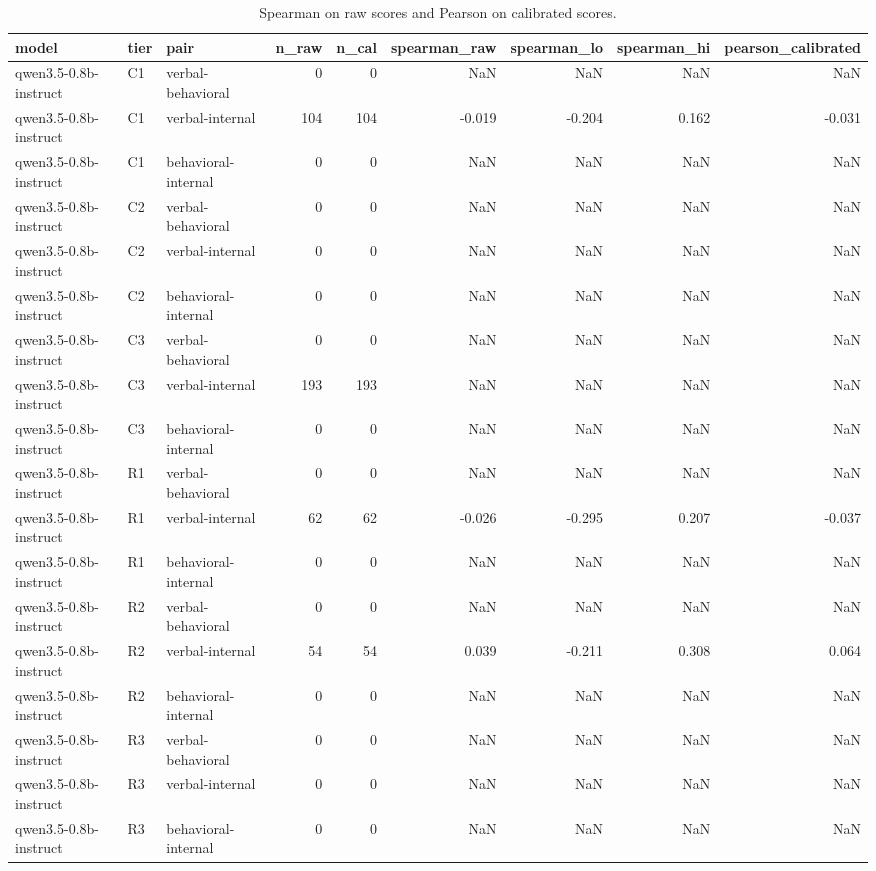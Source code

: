 \begin{table}
\caption{Spearman on raw scores and Pearson on calibrated scores.}
\label{tab:t9_signal_correlations}
\begin{tabular}{lllrrrrrr}
\toprule
model & tier & pair & n\_raw & n\_cal & spearman\_raw & spearman\_lo & spearman\_hi & pearson\_calibrated \\
\midrule
qwen3.5-0.8b-instruct & C1 & verbal-behavioral & 0 & 0 & NaN & NaN & NaN & NaN \\
qwen3.5-0.8b-instruct & C1 & verbal-internal & 104 & 104 & -0.019 & -0.204 & 0.162 & -0.031 \\
qwen3.5-0.8b-instruct & C1 & behavioral-internal & 0 & 0 & NaN & NaN & NaN & NaN \\
qwen3.5-0.8b-instruct & C2 & verbal-behavioral & 0 & 0 & NaN & NaN & NaN & NaN \\
qwen3.5-0.8b-instruct & C2 & verbal-internal & 0 & 0 & NaN & NaN & NaN & NaN \\
qwen3.5-0.8b-instruct & C2 & behavioral-internal & 0 & 0 & NaN & NaN & NaN & NaN \\
qwen3.5-0.8b-instruct & C3 & verbal-behavioral & 0 & 0 & NaN & NaN & NaN & NaN \\
qwen3.5-0.8b-instruct & C3 & verbal-internal & 193 & 193 & NaN & NaN & NaN & NaN \\
qwen3.5-0.8b-instruct & C3 & behavioral-internal & 0 & 0 & NaN & NaN & NaN & NaN \\
qwen3.5-0.8b-instruct & R1 & verbal-behavioral & 0 & 0 & NaN & NaN & NaN & NaN \\
qwen3.5-0.8b-instruct & R1 & verbal-internal & 62 & 62 & -0.026 & -0.295 & 0.207 & -0.037 \\
qwen3.5-0.8b-instruct & R1 & behavioral-internal & 0 & 0 & NaN & NaN & NaN & NaN \\
qwen3.5-0.8b-instruct & R2 & verbal-behavioral & 0 & 0 & NaN & NaN & NaN & NaN \\
qwen3.5-0.8b-instruct & R2 & verbal-internal & 54 & 54 & 0.039 & -0.211 & 0.308 & 0.064 \\
qwen3.5-0.8b-instruct & R2 & behavioral-internal & 0 & 0 & NaN & NaN & NaN & NaN \\
qwen3.5-0.8b-instruct & R3 & verbal-behavioral & 0 & 0 & NaN & NaN & NaN & NaN \\
qwen3.5-0.8b-instruct & R3 & verbal-internal & 0 & 0 & NaN & NaN & NaN & NaN \\
qwen3.5-0.8b-instruct & R3 & behavioral-internal & 0 & 0 & NaN & NaN & NaN & NaN \\

\end{tabular}
\end{table}
